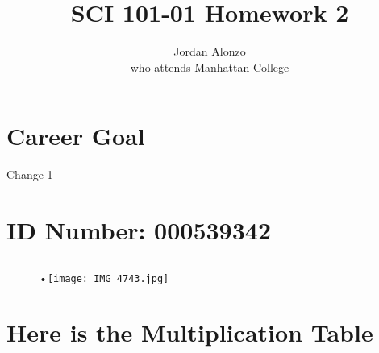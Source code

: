 \documentclass[11pt]{article}
\begin{document}
\title{SCI 101-01 Homework 2}
\author{Jordan Alonzo\\
who attends Manhattan College}
\maketitle




\section {Career Goal}
Change 1

\section{ID Number: 000539342}
\subsection{}
\begin{figure}[!h]
\begin{center}

•\texttt{[image: IMG\_4743.jpg]}
\end{center}
\end{figure}

\section {Here is the Multiplication Table}
\end{document}
